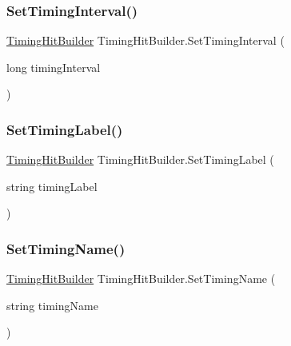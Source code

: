 \subsubsection{\texorpdfstring{Set\+Timing\+Interval()}{SetTimingInterval()}}
{\footnotesize\ttfamily \hyperlink{class_timing_hit_builder}{Timing\+Hit\+Builder} Timing\+Hit\+Builder.\+Set\+Timing\+Interval (\begin{DoxyParamCaption}\item[{long}]{timing\+Interval }\end{DoxyParamCaption})}

\mbox{\label{class_timing_hit_builder_af0b930098de4687376d35023063d8b80}} 
\subsubsection{\texorpdfstring{Set\+Timing\+Label()}{SetTimingLabel()}}
{\footnotesize\ttfamily \hyperlink{class_timing_hit_builder}{Timing\+Hit\+Builder} Timing\+Hit\+Builder.\+Set\+Timing\+Label (\begin{DoxyParamCaption}\item[{string}]{timing\+Label }\end{DoxyParamCaption})}

\mbox{\label{class_timing_hit_builder_a58b093d4c3d2ef9bc28ca6e889ddb280}} 
\subsubsection{\texorpdfstring{Set\+Timing\+Name()}{SetTimingName()}}
{\footnotesize\ttfamily \hyperlink{class_timing_hit_builder}{Timing\+Hit\+Builder} Timing\+Hit\+Builder.\+Set\+Timing\+Name (\begin{DoxyParamCaption}\item[{string}]{timing\+Name }\end{DoxyParamCaption})}

\mbox{\label{class_timing_hit_builder_ad8ac9c4003cc9d865198f01acb7f81bd}} 
